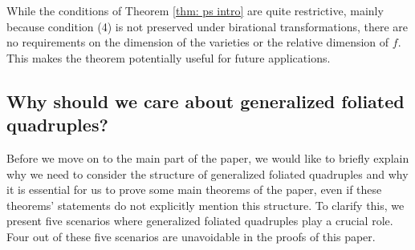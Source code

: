\documentclass[11pt]{amsart}
\numberwithin{equation}{section}
\theoremstyle{definition}
\theoremstyle{definition}
\theoremstyle{definition}
\begin{document}
While the conditions of Theorem \ref{thm: ps intro} are quite restrictive, mainly because condition (4) is not preserved under birational transformations, there are no requirements on the dimension of the varieties or the relative dimension of $f$. This makes the theorem potentially useful for future applications.

\subsection{Why should we care about generalized foliated quadruples?}\label{sec: reason to consider gfq}

Before we move on to the main part of the paper, we would like to briefly explain why we need to consider the structure of generalized foliated quadruples and why it is essential for us to prove some main theorems of the paper, even if these theorems' statements do not explicitly mention this structure. To clarify this, we present five scenarios where generalized foliated quadruples play a crucial role. Four out of these five scenarios are unavoidable in the proofs of this paper.
\end{document}
